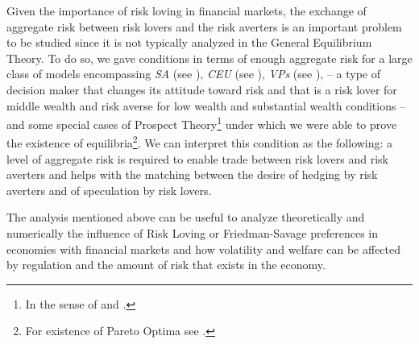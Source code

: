 \documentclass[pdftex]{article}
\numberwithin{equation}{section}
\theoremstyle{th}
\newtheorem{proof lemma}{{Proof Lemma}.}
\theoremstyle{definition}
\newtheorem*{risk lovers}{Risk lovers}
\newtheorem*{risk averse}{Risk averse}
\begin{document}
{Given the importance of risk loving in financial markets, the exchange of aggregate risk between risk lovers and the risk averters is an important problem to be studied since it is not typically analyzed in the General Equilibrium Theory. To do so, we gave conditions in terms of enough aggregate risk for a large class of models encompassing \emph{SA} (see \cite{KMM}), \emph{CEU} (see \cite{Schmeidler}), \emph{VPs} (see \cite{MMR}), \cite{FS} -- a type of decision maker that changes its attitude toward risk and that is a risk lover for middle wealth and risk averse for low wealth and substantial wealth conditions -- and some special cases of Prospect Theory\footnote{In the sense of \cite{JS} and \cite{KT92}.} under which we were able to prove the existence of equilibria\footnote{For existence of Pareto Optima see \cite{ABCN}.}. We can interpret this condition as the following: a level of aggregate risk is required to enable trade between risk lovers and risk averters and helps with the matching between the desire of hedging by risk averters and of speculation by risk lovers.

The analysis mentioned above can be useful to analyze theoretically and numerically the influence of Risk Loving or Friedman-Savage preferences in economies with financial markets and how volatility and welfare can be affected by regulation and the amount of risk that exists in the economy.



 




}
\end{document}
